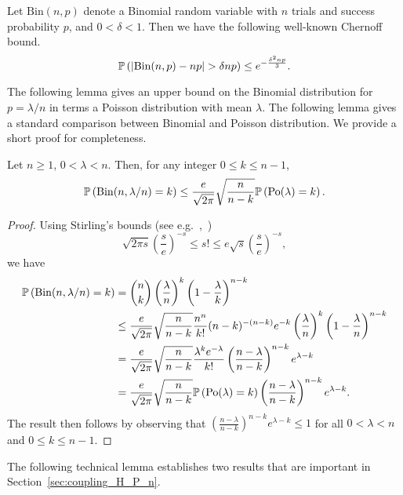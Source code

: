 \begin{appendices}
Let $\mathrm{Bin}(n,p)$ denote a Binomial random variable with $n$ trials and success probability $p$, and $0 < \delta < 1$. Then we have the following well-known Chernoff bound.
\begin{equation}\label{eq:def_chernoff_bound_binomial}
	\mathbb{P}\left(|\mathrm{Bin}(n,p) - np| > \delta np\right) \le e^{-\frac{\delta^2 np}{3}}.
\end{equation}

The following lemma gives an upper bound on the Binomial distribution for $p = \lambda/n$ in terms a Poisson distribution with mean $\lambda$.
The following lemma  gives a standard comparison between Binomial and Poisson distribution. We provide a short proof  for completeness.

\begin{lemma}\label{lem:binomial_poisson_bound}
Let $n \ge 1$, $0 < \lambda < n$. Then, for any integer $0 \le k \le n - 1$,
\[
	\mathbb{P}\left(\mathrm{Bin}(n,\lambda/n) = k\right) \le \frac{e}{\sqrt{2\pi}} \sqrt{\frac{n}{n-k}} \mathbb{P}\left({\mathrm{Po}}(\lambda) = k\right).
\]
\end{lemma}

\begin{proof}
Using Stirling's bounds (see e.g.~\cite{Dutkay2013},~\cite{Nanjundiah1959})
	\[
	\sqrt{2\pi s} \left(\frac{s}{e}\right)^{-s} \le s! \le e \sqrt{s} \left(\frac{s}{e}\right)^{-s},
	\]
we have
\begin{align*}
	\mathbb{P}\left(\mathrm{Bin}(n,\lambda/n) = k\right)
	&= \binom{n}{k} \left(\frac{\lambda}{n}\right)^k \left(1 - \frac{\lambda}{k}\right)^{n - k}\\
	&\le \frac{e}{\sqrt{2\pi}} \sqrt{\frac{n}{n - k}} \frac{n^n}{k!} (n-k)^{-(n-k)} e^{-k}
		\left(\frac{\lambda}{n}\right)^k \left(1 - \frac{\lambda}{n}\right)^{n - k}\\
	&= \frac{e}{\sqrt{2\pi}} \sqrt{\frac{n}{n - k}} \frac{\lambda^k e^{-\lambda}}{k!}
		\left(\frac{n-\lambda}{n - k}\right)^{n - k} e^{\lambda - k}\\
	&= \frac{e}{\sqrt{2\pi}} \sqrt{\frac{n}{n-k}} \mathbb{P}\left({\mathrm{Po}}(\lambda) = k\right)
		\left(\frac{n-\lambda}{n - k}\right)^{n - k} e^{\lambda - k}.
\end{align*}
The result then follows by observing that $\left(\frac{n-\lambda}{n - k}\right)^{n - k} e^{\lambda - k} \le 1$ for all $0 < \lambda < n$ and $0 \le k \le n - 1$.
\end{proof}

The following technical lemma establishes two results that are important in Section~\ref{sec:coupling_H_P_n}.


\end{appendices}
